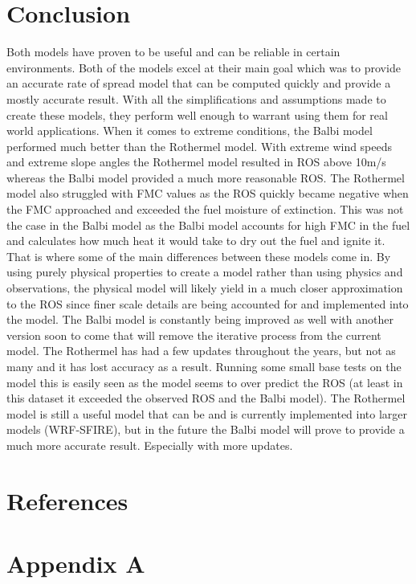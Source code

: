 \documentclass{article}
\begin{document}
\section{Conclusion}
\indent Both models have proven to be useful and can be reliable in certain environments. Both of the models excel at their main goal which was to provide an accurate rate of spread model that can be computed quickly and provide a mostly accurate result. With all the simplifications and assumptions made to create these models, they perform well enough to warrant using them for real world applications. When it comes to extreme conditions, the Balbi model performed much better than the Rothermel model. With extreme wind speeds and extreme slope angles the Rothermel model resulted in ROS above 10m/s whereas the Balbi model provided a much more reasonable ROS. The Rothermel model also struggled with FMC values as the ROS quickly became negative when the FMC approached and exceeded the fuel moisture of extinction. This was not the case in the Balbi model as the Balbi model accounts for high FMC in the fuel and calculates how much heat it would take to dry out the fuel and ignite it. That is where some of the main differences between these models come in. By using purely physical properties to create a model rather than using physics and observations, the physical model will likely yield in a much closer approximation to the ROS since finer scale details are being accounted for and implemented into the model. The Balbi model is constantly being improved as well with another version soon to come that will remove the iterative process from the current model. The Rothermel has had a few updates throughout the years, but not as many and it has lost accuracy as a result. Running some small base tests on the model this is easily seen as the model seems to over predict the ROS (at least in this dataset it exceeded the observed ROS and the Balbi model). The Rothermel model is still a useful model that can be and is currently implemented into larger models (WRF-SFIRE), but in the future the Balbi model will prove to provide a much more accurate result. Especially with more updates. 
\section{References}
\newpage



\section{Appendix A}
\end{document}
